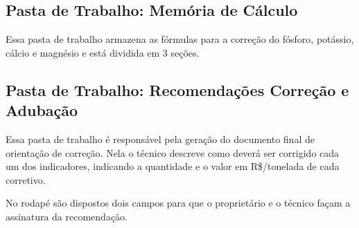 \subsection{Pasta de Trabalho: Memória de Cálculo}
\label{subsec:memoriadecalculo}

Essa pasta de trabalho armazena as fórmulas para a correção do fósforo, potássio, cálcio e magnésio e está dividida em 3 seções.

\subsection{Pasta de Trabalho: Recomendações Correção e Adubação}
\label{subsec:recomendacoes}

Essa pasta de trabalho é responsável pela geração do documento final de orientação de correção. Nela o técnico descreve como deverá ser corrigido cada um dos indicadores, indicando a quantidade e o valor em R\$/tonelada de cada corretivo.

No rodapé são dispostos dois campos para que o proprietário e o técnico façam a assinatura da recomendação.
